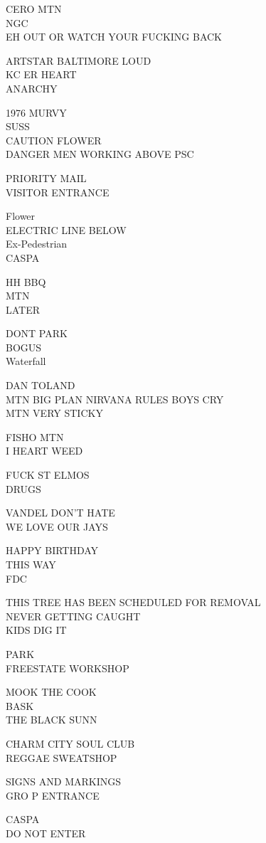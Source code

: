 \documentclass[10pt,letterpaper]{article}
\begin{document}
CERO MTN\\
NGC\\
EH OUT OR WATCH YOUR FUCKING BACK

ARTSTAR BALTIMORE LOUD\\
KC ER HEART\\
ANARCHY

1976 MURVY\\
SUSS\\
CAUTION FLOWER\\
DANGER MEN WORKING ABOVE PSC

PRIORITY MAIL\\
VISITOR ENTRANCE

Flower\\
ELECTRIC LINE BELOW\\
Ex{-}Pedestrian\\
CASPA

HH BBQ\\
MTN\\
LATER

DONT PARK\\
BOGUS\\
Waterfall

DAN TOLAND\\
MTN BIG PLAN NIRVANA RULES BOYS CRY\\
MTN VERY STICKY

FISHO MTN\\
I HEART WEED

FUCK ST ELMOS\\
DRUGS

VANDEL DON'T HATE\\
WE LOVE OUR JAYS

HAPPY BIRTHDAY\\
THIS WAY\\
FDC

THIS TREE HAS BEEN SCHEDULED FOR REMOVAL\\
NEVER GETTING CAUGHT\\
KIDS DIG IT

PARK\\
FREESTATE WORKSHOP

MOOK THE COOK\\
BASK\\
THE BLACK SUNN

CHARM CITY SOUL CLUB\\
REGGAE SWEATSHOP

SIGNS AND MARKINGS\\
GRO P ENTRANCE

CASPA\\
DO NOT ENTER
\end{document}
